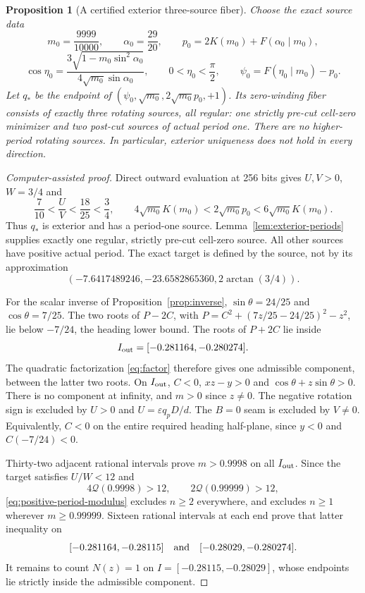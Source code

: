 \documentclass[11pt,a4paper]{article}
\newtheorem{proposition}[theorem]{Proposition}
\theoremstyle{remark}\newtheorem{remark}[theorem]{Remark}
\begin{document}
\begin{proposition}[A certified exterior three-source fiber]
\label{prop:exterior-three}
Choose the exact source data
\[
 m_0=\frac{9999}{10000},\qquad \alpha_0=\frac{29}{20},\qquad
 p_0=2K(m_0)+F(\alpha_0\mid m_0),
\]
\[
 \cos\eta_0=\frac{3\sqrt{1-m_0\sin^2\alpha_0}}
 {4\sqrt{m_0}\sin\alpha_0},\qquad 0<\eta_0<\frac\pi2,
 \qquad \psi_0=F(\eta_0\mid m_0)-p_0.
\]
Let $q_*$ be the endpoint of $(\psi_0,\sqrt{m_0},2\sqrt{m_0}p_0,+1)$.
Its zero-winding fiber consists of exactly three rotating sources, all
regular: one strictly pre-cut cell-zero minimizer and two post-cut
sources of actual period one. There are no higher-period rotating sources.
In particular, exterior uniqueness does not hold in every direction.
\end{proposition}
\begin{proof}[Computer-assisted proof]
Direct outward evaluation at 256 bits gives $U,V>0$, $W=3/4$ and
\[
 \frac7{10}<\frac UV<\frac{18}{25}<\frac34,\qquad
 4\sqrt{m_0}K(m_0)<2\sqrt{m_0}p_0<6\sqrt{m_0}K(m_0).
\]
Thus $q_*$ is exterior and has a period-one source.
Lemma~\ref{lem:exterior-periods} supplies exactly one regular, strictly
pre-cut cell-zero source. All other sources have positive actual period.
The exact target is defined by the source, not by its approximation
\[
 (-7.6417489246,-23.6582865360,2\arctan(3/4)).
\]

For the scalar inverse of Proposition~\ref{prop:inverse},
$\sin\theta=24/25$ and $\cos\theta=7/25$.
The two roots of $P-2C$, with
$P=C^2+(7z/25-24/25)^2-z^2$, lie below $-7/24$, the
heading lower bound. The roots of $P+2C$ lie inside
\[
 I_{\rm out}=[-0.281164,-0.280274].
\]
The quadratic factorization \eqref{eq:factor} therefore gives one
admissible component, between the latter two roots.
On $I_{\rm out}$, $C<0$, $xz-y>0$ and $\cos\theta+z\sin\theta>0$.
There is no component at infinity, and $m>0$ since $z\ne0$.
The negative rotation sign is excluded by $U>0$ and
$U=\varepsilon q_pD/d$. The $B=0$ seam is excluded by $V\ne0$.
Equivalently, $C<0$ on the entire required heading half-plane,
since $y<0$ and $C(-7/24)<0$.

Thirty-two adjacent rational intervals prove $m>0.9998$ on all
$I_{\rm out}$. Since the target satisfies $U/W<12$ and
\[
 4\mathcal Q(0.9998)>12,\qquad 2\mathcal Q(0.99999)>12,
\]
\eqref{eq:positive-period-modulus} excludes $n\ge2$ everywhere,
and excludes $n\ge1$ wherever $m\ge0.99999$.
Sixteen rational intervals at each end prove that latter inequality on
\[
 [-0.281164,-0.28115]\quad\hbox{and}\quad[-0.28029,-0.280274].
\]
It remains to count $N(z)=1$ on $I=[-0.28115,-0.28029]$, whose
endpoints lie strictly inside the admissible component.


\end{proof}
\end{document}

